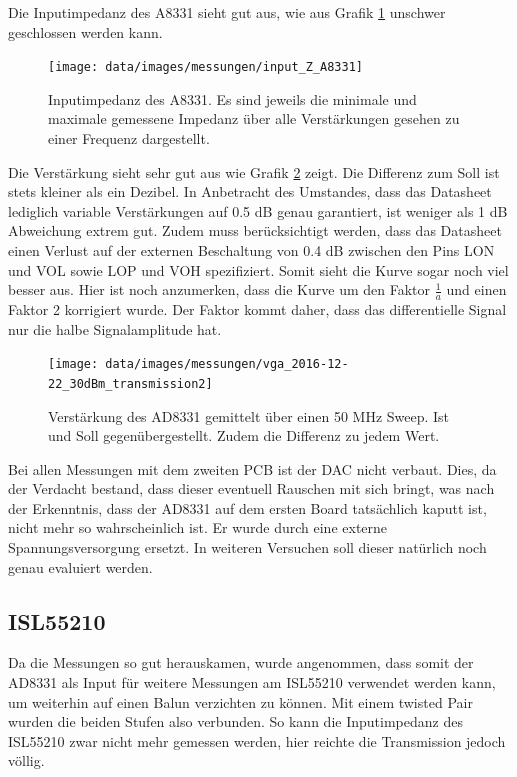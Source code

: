Die Inputimpedanz des A8331 sieht gut aus, wie aus Grafik \ref{fig:Z_in_A8331} unschwer geschlossen werden kann.

\begin{figure}[H]
\begin{center}
    \texttt{[image: data/images/messungen/input\_Z\_A8331]}
    \caption{Inputimpedanz des A8331. Es sind jeweils die minimale und maximale gemessene Impedanz über alle Verstärkungen gesehen zu einer Frequenz dargestellt.}
    \label{fig:Z_in_A8331}
\end{center}
\end{figure}

Die Verstärkung sieht sehr gut aus wie Grafik \ref{fig:T_A8331} zeigt. Die Differenz zum Soll ist stets kleiner als ein Dezibel. In Anbetracht des Umstandes, dass das Datasheet lediglich variable Verstärkungen auf 0.5 dB genau garantiert, ist weniger als 1 dB Abweichung extrem gut. Zudem muss berücksichtigt werden, dass das Datasheet einen Verlust auf der externen Beschaltung von 0.4 dB zwischen den Pins LON und VOL sowie LOP und VOH spezifiziert.
Somit sieht die Kurve sogar noch viel besser aus.
Hier ist noch anzumerken, dass die Kurve um den Faktor $\frac{1}{a}$ und einen Faktor 2 korrigiert wurde. Der Faktor kommt daher, dass das differentielle Signal nur die halbe Signalamplitude hat. 

\begin{figure}[H]
\begin{center}
    \texttt{[image: data/images/messungen/vga\_2016-12-22\_30dBm\_transmission2]}
    \caption{Verstärkung des AD8331 gemittelt über einen 50 MHz Sweep. Ist und Soll gegenübergestellt. Zudem die Differenz zu jedem Wert.}
    \label{fig:T_A8331}
\end{center}
\end{figure}

Bei allen Messungen mit dem zweiten PCB ist der DAC nicht verbaut. Dies, da der Verdacht bestand, dass dieser eventuell Rauschen mit sich bringt, was nach der Erkenntnis, dass der AD8331 auf dem ersten Board tatsächlich kaputt ist, nicht mehr so wahrscheinlich ist. Er wurde durch eine externe Spannungsversorgung ersetzt. In weiteren Versuchen soll dieser natürlich noch genau evaluiert werden.

\subsection{ISL55210}

Da die Messungen so gut herauskamen, wurde angenommen, dass somit der AD8331 als Input für weitere Messungen am ISL55210 verwendet werden kann, um weiterhin auf einen Balun verzichten zu können. Mit einem twisted Pair wurden die beiden Stufen also verbunden. So kann die Inputimpedanz des ISL55210 zwar nicht mehr gemessen werden, hier reichte die Transmission jedoch völlig.

